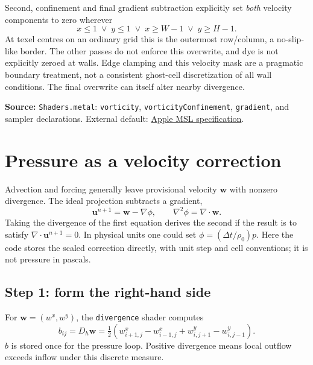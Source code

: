 \documentclass[11pt,a4paper]{article}
\newcommand{\uvec}{\mathbf{u}}
\newcommand{\src}[1]{\par{\footnotesize\raggedright\color{teal}\textbf{Source:} #1\par}}
\newcommand{\code}[1]{\texttt{#1}}
\newcommand{\page}[1]{\clearpage\section{#1}}
\begin{document}
Second, confinement and final gradient subtraction explicitly set \emph{both}
velocity components to zero wherever
\begin{equation}
 x\leq1\;\lor\;y\leq1\;\lor\;x\geq W-1\;\lor\;y\geq H-1.
\end{equation}
At texel centres on an ordinary grid this is the outermost row/column, a
no-slip-like border. The other passes do not enforce this overwrite, and dye is
not explicitly zeroed at walls. Edge clamping and this velocity mask are a
pragmatic boundary treatment, not a consistent ghost-cell discretization of all
wall conditions. The final overwrite can itself alter nearby divergence.
\src{\code{Shaders.metal}: \code{vorticity}, \code{vorticityConfinement},
\code{gradient}, and sampler declarations. External default:
\href{https://developer.apple.com/metal/Metal-Shading-Language-Specification.pdf}{Apple MSL specification}.}

\page{Pressure as a velocity correction}
Advection and forcing generally leave provisional velocity $\mathbf w$ with
nonzero divergence. The ideal projection subtracts a gradient,
\begin{equation}
 \uvec^{n+1}=\mathbf w-\nabla\phi,\qquad
 \nabla^2\phi=\nabla\cdot\mathbf w.\label{eq:projection}
\end{equation}
Taking the divergence of the first equation derives the second if the result is
to satisfy $\nabla\cdot\uvec^{n+1}=0$. In physical units one could set
$\phi=(\Delta t/\rho_0)p$. Here the code stores the scaled correction directly,
with unit step and cell conventions; it is not pressure in pascals.

\subsection*{Step 1: form the right-hand side}
For $\mathbf w=(w^x,w^y)$, the \code{divergence} shader computes
\begin{equation}
 b_{ij}=D_h\mathbf w
 =\tfrac12\left(w^x_{i+1,j}-w^x_{i-1,j}
                +w^y_{i,j+1}-w^y_{i,j-1}\right).
 \label{eq:divergence}
\end{equation}
$b$ is stored once for the pressure loop. Positive divergence means local
outflow exceeds inflow under this discrete measure.
\end{document}
